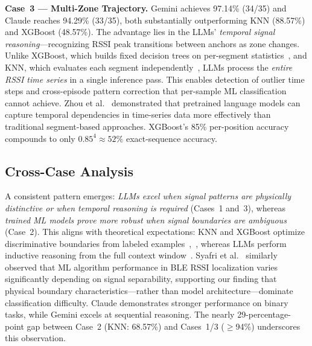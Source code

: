 \documentclass[conference]{IEEEtran}
\begin{document}
\textbf{Case~3 --- Multi-Zone Trajectory.}
Gemini achieves 97.14\% (34/35) and Claude reaches 94.29\% (33/35), both substantially outperforming KNN (88.57\%) and XGBoost (48.57\%). The advantage lies in the LLMs' \textit{temporal signal reasoning}---recognizing RSSI peak transitions between anchors as zone changes. Unlike XGBoost, which builds fixed decision trees on per-segment statistics~\cite{b16}, and KNN, which evaluates each segment independently~\cite{b15}, LLMs process the \textit{entire RSSI time series} in a single inference pass. This enables detection of outlier time steps and cross-episode pattern correction that per-sample ML classification cannot achieve. Zhou et al.~\cite{b17} demonstrated that pretrained language models can capture temporal dependencies in time-series data more effectively than traditional segment-based approaches. XGBoost's 85\% per-position accuracy compounds to only $0.85^4 \approx 52\%$ exact-sequence accuracy.


\subsection{Cross-Case Analysis}
A consistent pattern emerges: \textit{LLMs excel when signal patterns are physically distinctive or when temporal reasoning is required} (Cases~1 and~3), whereas \textit{trained ML models prove more robust when signal boundaries are ambiguous} (Case~2). This aligns with theoretical expectations: KNN and XGBoost optimize discriminative boundaries from labeled examples~\cite{b15},~\cite{b16}, whereas LLMs perform inductive reasoning from the full context window~\cite{b17}. Syafri et al.~\cite{b5} similarly observed that ML algorithm performance in BLE RSSI localization varies significantly depending on signal separability, supporting our finding that physical boundary characteristics---rather than model architecture---dominate classification difficulty. Claude demonstrates stronger performance on binary tasks, while Gemini excels at sequential reasoning. The nearly 29-percentage-point gap between Case~2 (KNN: 68.57\%) and Cases~1/3 ($\geq$94\%) underscores this observation.
\end{document}
